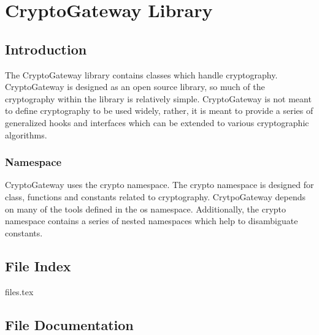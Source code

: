 \part{CryptoGateway Library} \label{sec:cryptogateway}

	\chapter{Introduction}

	The CryptoGateway library contains classes which handle cryptography.  CryptoGateway is designed as an open source library, so much of the cryptography within the library is relatively simple.  CryptoGateway is not meant to define cryptography to be used widely, rather, it is meant to provide a series of generalized hooks and interfaces which can be extended to various cryptographic algorithms.
		
		\section{Namespace} \label{sec:Namespace}
		CryptoGateway uses the crypto namespace.  The crypto namespace is designed for class, functions and constants related to cryptography.  CrytpoGateway depends on many of the tools defined in the os namespace.  Additionally, the crypto namespace contains a series of nested namespaces which help to disambiguate constants.
		
		\renewcommand{\DOXYGENFOLDER}{../../CryptoGateway/Documentation/doxygenFiles/latex/}
	
	\chapter{File Index}
		{files.tex}
	\chapter{File Documentation}
	

